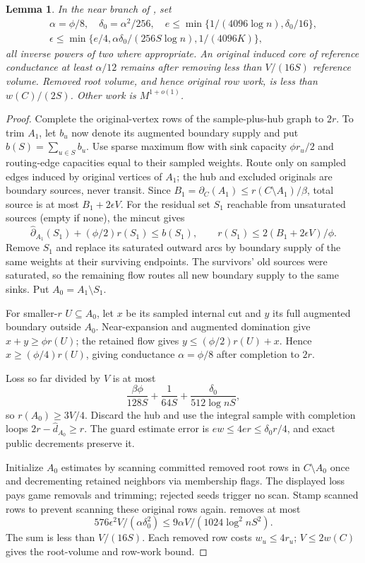 \documentclass[11pt]{article}
\newtheorem{lemma}[theorem]{Lemma}
\theoremstyle{remark}
\begin{document}
\begin{lemma}\label{struct27:lem:bootstrap}
In the near branch of , set
\begin{equation}\label{struct27:eq:bootstrapparam}
\begin{gathered}
 \alpha=\phi/8,\quad\delta_0=\alpha^2/256,\quad
 e\le\min\{1/(4096\log n),\delta_0/16\},\\
 \epsilon\le\min\{e/4,\alpha\delta_0/(256S\log n),1/(4096K)\},
\end{gathered}
\end{equation}
all inverse powers of two where appropriate.
An original induced core of reference conductance at least $\alpha/12$ remains
after removing less than $V/(16S)$ reference volume.
Removed root volume, and hence original row work, is less than $w(C)/(2S)$.
Other work is $M^{1+o(1)}$.
\end{lemma} \begin{proof} Complete the original-vertex rows of the
sample-plus-hub graph to $2r$.
To trim $A_1$, let $b_u$ now denote its augmented boundary supply and put
$b(S)=\sum_{u\in S}b_u$.
Use sparse maximum flow with sink capacity $\phi r_u/2$ and routing-edge
capacities equal to their sampled weights.
Route only on sampled edges induced by original vertices of $A_1$; the hub and
excluded originals are boundary sources, never transit.
Since $B_1=\partial_C(A_1)\le r(C\setminus A_1)/\beta$, total source is at most
$B_1+2\epsilon V$.
For the residual set $S_1$ reachable from unsaturated sources (empty if none),
the mincut gives
\[
 \widehat\partial_{A_1}(S_1)+(\phi/2)r(S_1)\le b(S_1),\qquad
 r(S_1)\le2(B_1+2\epsilon V)/\phi.
\]
Remove $S_1$ and replace its saturated outward arcs by boundary supply of the
same weights at their surviving endpoints.
The survivors' old sources were saturated, so the remaining flow routes all new
boundary supply to the same sinks.
Put $A_0=A_1\setminus S_1$.

For smaller-$r$ $U\subseteq A_0$, let $x$ be its sampled internal cut and $y$
its full augmented boundary outside $A_0$.
Near-expansion and augmented domination give $x+y\ge\phi r(U)$; the retained
flow gives $y\le(\phi/2)r(U)+x$.
Hence $x\ge(\phi/4)r(U)$, giving conductance $\alpha=\phi/8$ after completion to
$2r$.

Loss so far divided by $V$ is at most
\[
 \frac{\beta\phi}{128S}+\frac1{64S}+\frac{\delta_0}{512\log nS},
\]
so $r(A_0)\ge3V/4$.
Discard the hub and use the integral sample with completion loops $2r-\widehat
d_{A_0}\ge r$.
The guard estimate error is $ew\le4er\le\delta_0r/4$, and exact public
decrements preserve it.

Initialize $A_0$ estimates by scanning committed removed root rows in
$C\setminus A_0$ once and decrementing retained neighbors via membership flags.
The displayed loss pays game removals and trimming; rejected seeds trigger no
scan.
Stamp scanned rows to prevent scanning these original rows again.
 removes at most
\[
 576\epsilon^2V/(\alpha\delta_0^2)
 \le9\alpha V/(1024\log^2 nS^2).
\]
The sum is less than $V/(16S)$.
Each removed row costs $w_u\le4r_u$; $V\le2w(C)$ gives the root-volume and
row-work bound.
\end{proof}
\end{document}
